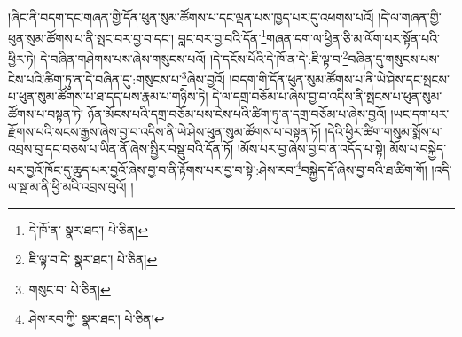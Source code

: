 །ཞིང་ནི་བདག་དང་གཞན་གྱི་དོན་ཕུན་སུམ་ཚོགས་པ་དང་ལྡན་པས་ཁྱད་པར་དུ་འཕགས་པའོ། །དེ་ལ་གཞན་གྱི་ཕུན་སུམ་ཚོགས་པ་ནི་སྤང་བར་བྱ་བ་དང་། བླང་བར་བྱ་བའི་དོན་\footnote{དེ་ཁོ་ན་  སྣར་ཐང་།  པེ་ཅིན། }གཞན་དག་ལ་ཕྱིན་ཅི་མ་ལོག་པར་སྟོན་པའི་ཕྱིར་ཏེ། དེ་བཞིན་གཤེགས་པས་ཞེས་གསུངས་པའོ། །དེ་དངོས་པོའི་དེ་ཁོ་ན་དེ་:ཇི་ལྟ་བ་\footnote{ཇི་ལྟ་བ་དེ་  སྣར་ཐང་།  པེ་ཅིན། }བཞིན་དུ་གསུངས་པས་ངེས་པའི་ཚིག་ཏུ་ན་དེ་བཞིན་དུ་:གསུངས་པ་\footnote{གསུང་བ་  པེ་ཅིན། }ཞེས་བྱའོ། །བདག་གི་དོན་ཕུན་སུམ་ཚོགས་པ་ནི་ཡེ་ཤེས་དང་སྤངས་པ་ཕུན་སུམ་ཚོགས་པ་ཐ་དད་པས་རྣམ་པ་གཉིས་ཏེ། དེ་ལ་དགྲ་བཅོམ་པ་ཞེས་བྱ་བ་འདིས་ནི་སྤངས་པ་ཕུན་སུམ་ཚོགས་པ་བསྟན་ཏེ། ཉོན་མོངས་པའི་དགྲ་བཅོམ་པས་ངེས་པའི་ཚིག་ཏུ་ན་དགྲ་བཅོམ་པ་ཞེས་བྱའོ། །ཡང་དག་པར་རྫོགས་པའི་སངས་རྒྱས་ཞེས་བྱ་བ་འདིས་ནི་ཡེ་ཤེས་ཕུན་སུམ་ཚོགས་པ་བསྟན་ཏོ། །དེའི་ཕྱིར་ཚིག་གསུམ་སྨོས་པ་འབྲས་བུ་དང་བཅས་པ་ཡིན་ནོ་ཞེས་སྤྱིར་བསྡུ་བའི་དོན་ཏོ། །མོས་པར་བྱ་ཞེས་བྱ་བ་ན་འདོད་པ་སྟེ། མོས་པ་བསྐྱེད་པར་བྱའོ་ཁོང་དུ་ཆུད་པར་བྱའོ་ཞེས་བྱ་བ་ནི་རྟོགས་པར་བྱ་བ་སྟེ་:ཤེས་རབ་\footnote{ཤེས་རབ་ཀྱི་  སྣར་ཐང་།  པེ་ཅིན། }བསྐྱེད་དོ་ཞེས་བྱ་བའི་ཐ་ཚིག་གོ། །འདི་ལ་སྔ་མ་ནི་ཕྱི་མའི་འབྲས་བུའོ། །
